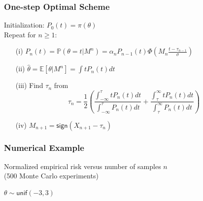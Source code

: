 \documentclass[mathserif]{beamer}
\newcommand{\sgn}{\mathsf{sign}}
\newcommand{\unif}{\mathsf{unif}}
\newcommand{\Prob}{\mathbb{P}}
\begin{document}
\begin{frame}
\frametitle{One-step Optimal Scheme}
Initialization: $P_0(t) = \pi(\theta)$ \\
Repeat for $n \geq 1$:
\begin{itemize}
\item[(i)] $P_n(t) = \Prob(\theta = t|M^n) = \alpha_n P_{n-1}(t) \Phi \left(M_n \frac{t-\tau_{n-1}}{\sigma} \right)$ 
\item[(ii)] $\widehat{\theta} = \mathbb E[\theta | M^n] = \int t P_n(t)dt $ 
\item[(iii)] Find $\tau_n$ from 
\[
\tau_n = \frac{1}{2} \left( \frac{ \int_{-\infty}^\tau t P_n(t)dt }{\int_{-\infty}^\tau P_n(t)dt}  + \frac{ \int_{\tau}^\infty t P_n(t)dt}{\int_{\tau}^\infty P_n(t)dt} \right)
\]
\item[(iv)] $M_{n+1} = \sgn(X_{n+1}-\tau_n)$
\end{itemize}
\end{frame}

\begin{frame}
\frametitle{Numerical Example}
\begin{center}
Normalized empirical risk versus number of samples $n$ \\
(500 Monte Carlo experiments)
$\theta \sim \unif(-3,3)$
\end{center}
\end{frame}
\end{document}
